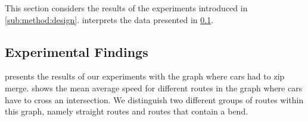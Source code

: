 This section considers the results of the experiments introduced in \cref{sub:method:design}.  interprets the data presented in \cref{sub:results:experimental}.

\subsection{Experimental Findings}
\label{sub:results:experimental}
 presents the results of our experiments with the graph where cars had to zip merge.  shows the mean average speed for different routes in the graph where cars have to cross an intersection. We distinguish two different groups of routes within this graph, namely straight routes and routes that contain a bend. 

